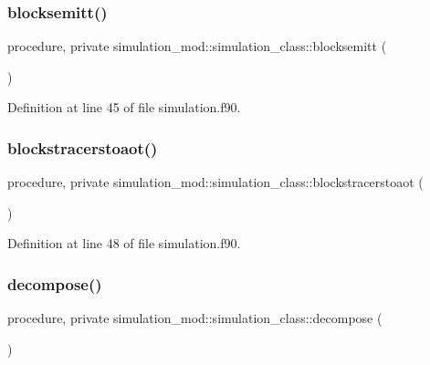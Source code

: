 \subsubsection{\texorpdfstring{blocksemitt()}{blocksemitt()}}
{\footnotesize\ttfamily procedure, private simulation\+\_\+mod\+::simulation\+\_\+class\+::blocksemitt (\begin{DoxyParamCaption}{ }\end{DoxyParamCaption})\hspace{0.3cm}{\ttfamily [private]}}



Definition at line 45 of file simulation.\+f90.

\mbox{\label{structsimulation__mod_1_1simulation__class_a86fd4b37e89c2ecbcdef93b156d83fc4}} 
\subsubsection{\texorpdfstring{blockstracerstoaot()}{blockstracerstoaot()}}
{\footnotesize\ttfamily procedure, private simulation\+\_\+mod\+::simulation\+\_\+class\+::blockstracerstoaot (\begin{DoxyParamCaption}{ }\end{DoxyParamCaption})\hspace{0.3cm}{\ttfamily [private]}}



Definition at line 48 of file simulation.\+f90.

\mbox{\label{structsimulation__mod_1_1simulation__class_a559d8d450db2c6b568cb6e0e4dbab350}} 
\subsubsection{\texorpdfstring{decompose()}{decompose()}}
{\footnotesize\ttfamily procedure, private simulation\+\_\+mod\+::simulation\+\_\+class\+::decompose (\begin{DoxyParamCaption}{ }\end{DoxyParamCaption})\hspace{0.3cm}{\ttfamily [private]}}




